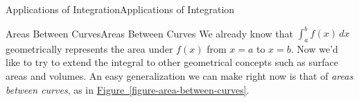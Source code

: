 \documentclass[10pt,]{book}
\numberwithin{equation}{section}
\begin{document}
%
%
\typeout{************************************************}
\typeout{************************************************}
%
\begin{chapterptx}{Applications of Integration}{}{Applications of Integration}{}{}\label{applications-of-integration}
%
%
\typeout{************************************************}
\typeout{************************************************}
%
\begin{sectionptx}{Areas Between Curves}{}{Areas Between Curves}{}{}\label{section-areas-between-curves}
\hypertarget{p-613}{}%
We already know that \(\int_{a}^{b}f(x)\,dx\) geometrically represents the area under \(f(x)\) from \(x = a\) to \(x = b\). Now we'd like to try to extend the integral to other geometrical concepts such as surface areas and volumes. An easy generalization we can make right now is that of \emph{areas between curves}, as in \hyperref[figure-area-between-curves]{Figure~\ref{figure-area-between-curves}}.%
\begin{figure}
\centering
{
}
\end{figure}
\end{sectionptx}
\end{chapterptx}
\end{document}
